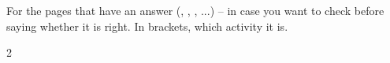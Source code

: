\section*{\lblClave}

For the pages that have an answer (\lblClasifica, \lblUne, \lblVF,
\lblTrueque...) -- in case you want to check before saying whether it is
right. In brackets, which activity it is.

\begin{multicols}{2}
\footnotesize
\begin{itemize}[leftmargin=0mm, label={}, itemsep=2mm, topsep=0mm]

\end{itemize}
\end{multicols}
\newpage
